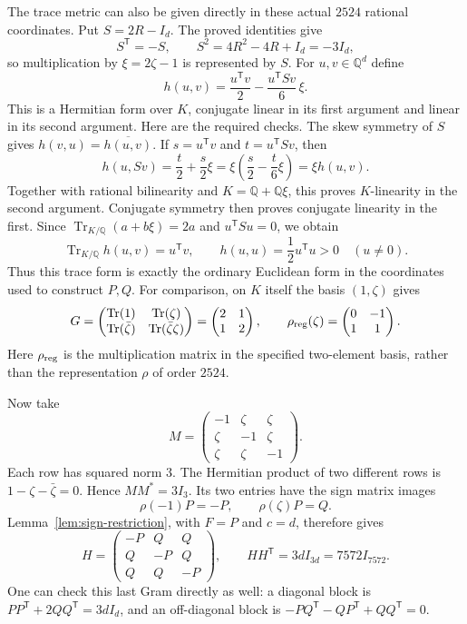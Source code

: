 \documentclass[10pt]{article}
\newcommand{\Q}{\mathbb Q}
\newcommand{\Tr}{\operatorname{Tr}}
\begin{document}
The trace metric can also be given directly in these actual
$2524$ rational coordinates. Put $S=2R-I_d$. The proved identities give
\[
 S^{\mathsf T}=-S,\qquad
 S^2=4R^2-4R+I_d=-3I_d,
\]
so multiplication by $\xi=2\zeta-1$ is represented by $S$.
For $u,v\in\Q^d$ define
\begin{equation}\label{eq:actual-hermitian-form}
 h(u,v)=\frac{u^{\mathsf T}v}{2}
                 -\frac{u^{\mathsf T}Sv}{6}\,\xi.
\end{equation}
This is a Hermitian form over $K$, conjugate linear in its first
argument and linear in its second argument. Here are the required
checks. The skew symmetry of $S$ gives
$h(v,u)=\overline{h(u,v)}$. If $s=u^{\mathsf T}v$ and
$t=u^{\mathsf T}Sv$, then
\[
 h(u,Sv)=\frac t2+\frac s2\xi
       =\xi\left(\frac s2-\frac t6\xi\right)
       =\xi h(u,v).
\]
Together with rational bilinearity and $K=\Q+\Q\xi$, this proves
$K$-linearity in the second argument. Conjugate symmetry then proves
conjugate linearity in the first. Since
$\Tr_{K/\Q}(a+b\xi)=2a$ and $u^{\mathsf T}Su=0$, we obtain
\[
 \Tr_{K/\Q}h(u,v)=u^{\mathsf T}v,
 \qquad h(u,u)=\frac12u^{\mathsf T}u>0\quad(u\ne0).
\]
Thus this trace form is exactly the ordinary Euclidean form in the
coordinates used to construct $P,Q$. For comparison, on $K$ itself
the basis $(1,\zeta)$ gives
\[
 G=\begin{pmatrix}
 \Tr(1)&\Tr(\zeta)\\
 \Tr(\bar\zeta)&\Tr(\bar\zeta\zeta)
 \end{pmatrix}
 =\begin{pmatrix}2&1\\1&2\end{pmatrix},\qquad
 \rho_{\rm reg}(\zeta)=\begin{pmatrix}0&-1\\1&1\end{pmatrix}.
\]
Here $\rho_{\rm reg}$ is the multiplication matrix in the specified
two-element basis, rather than the representation $\rho$ of order
$2524$.

Now take
\[
 M=\begin{pmatrix}
 -1&\zeta&\zeta\\
 \zeta&-1&\zeta\\
 \zeta&\zeta&-1
 \end{pmatrix}.
\]
Each row has squared norm $3$. The Hermitian product of two different
rows is $1-\zeta-\bar\zeta=0$. Hence $MM^*=3I_3$.
Its two entries have the sign matrix images
\[
 \rho(-1)P=-P,\qquad \rho(\zeta)P=Q.
\]
Lemma~\ref{lem:sign-restriction}, with $F=P$ and $c=d$, therefore gives
\[
 H=\begin{pmatrix}-P&Q&Q\\Q&-P&Q\\Q&Q&-P\end{pmatrix},
 \qquad HH^{\mathsf T}=3dI_{3d}=7572I_{7572}.
\]
One can check this last Gram directly as well: a diagonal block is
$PP^{\mathsf T}+2QQ^{\mathsf T}=3dI_d$, and an off-diagonal block is
$-PQ^{\mathsf T}-QP^{\mathsf T}+QQ^{\mathsf T}=0$.
\end{document}
